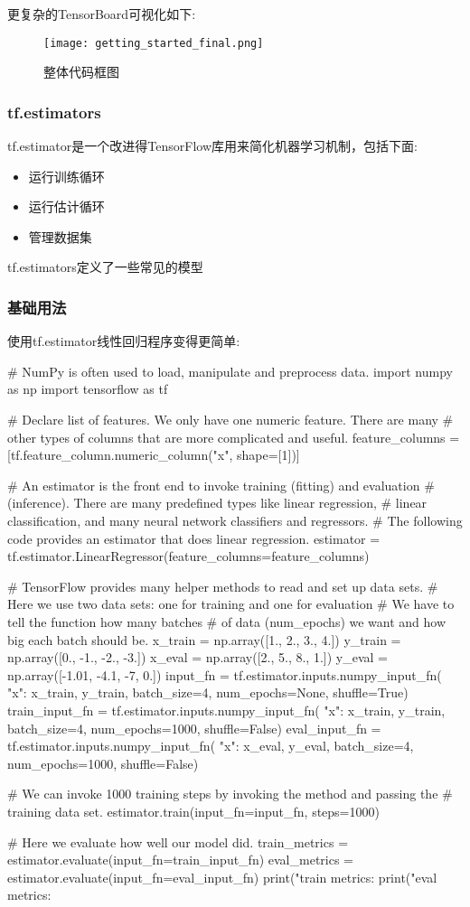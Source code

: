更复杂的TensorBoard可视化如下:
\begin{figure}[H]
\centering
\texttt{[image: getting\_started\_final.png]}
\caption{整体代码框图}
\end{figure}
\subsubsection{tf.estimators}
tf.estimator是一个改进得TensorFlow库用来简化机器学习机制，包括下面:
\begin{itemize}
\item 运行训练循环
\item 运行估计循环
\item 管理数据集
\end{itemize}
tf.estimators定义了一些常见的模型
\subsubsection{基础用法}
使用tf.estimator线性回归程序变得更简单:
\begin{pythoncode}
# NumPy is often used to load, manipulate and preprocess data.
import numpy as np
import tensorflow as tf

# Declare list of features. We only have one numeric feature. There are many
# other types of columns that are more complicated and useful.
feature_columns = [tf.feature_column.numeric_column("x", shape=[1])]

# An estimator is the front end to invoke training (fitting) and evaluation
# (inference). There are many predefined types like linear regression,
# linear classification, and many neural network classifiers and regressors.
# The following code provides an estimator that does linear regression.
estimator = tf.estimator.LinearRegressor(feature_columns=feature_columns)

# TensorFlow provides many helper methods to read and set up data sets.
# Here we use two data sets: one for training and one for evaluation
# We have to tell the function how many batches
# of data (num_epochs) we want and how big each batch should be.
x_train = np.array([1., 2., 3., 4.])
y_train = np.array([0., -1., -2., -3.])
x_eval = np.array([2., 5., 8., 1.])
y_eval = np.array([-1.01, -4.1, -7, 0.])
input_fn = tf.estimator.inputs.numpy_input_fn(
    {"x": x_train}, y_train, batch_size=4, num_epochs=None, shuffle=True)
train_input_fn = tf.estimator.inputs.numpy_input_fn(
    {"x": x_train}, y_train, batch_size=4, num_epochs=1000, shuffle=False)
eval_input_fn = tf.estimator.inputs.numpy_input_fn(
    {"x": x_eval}, y_eval, batch_size=4, num_epochs=1000, shuffle=False)

# We can invoke 1000 training steps by invoking the  method and passing the
# training data set.
estimator.train(input_fn=input_fn, steps=1000)

# Here we evaluate how well our model did.
train_metrics = estimator.evaluate(input_fn=train_input_fn)
eval_metrics = estimator.evaluate(input_fn=eval_input_fn)
print("train metrics: %
print("eval metrics: %
\end{pythoncode}

